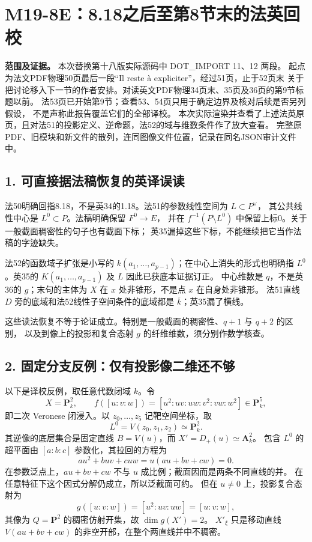 \begingroup
\section*{M19-8E：8.18之后至第8节末的法英回校}

\noindent\textbf{范围及证据。}
本次替换第十八版实际源码中 DOT\_IMPORT 11、12 两段。
起点为法文PDF物理50页最后一段“Il reste à expliciter”，经过51页，止于52页末
关于把讨论移入下一节的作者安排。对读英文PDF物理34页末、35页及36页的第9节标题以前。
法53页已开始第9节；查看53、54页只用于确定边界及核对后续是否另列假设，
不是声称此报告覆盖它们的全部译校。
本次实际渲染并查看了上述法英原页，且对法51的投影定义、逆命题，法52的域与维数条件作了放大查看。
完整原PDF、旧模块和新文件的散列，连同图像文件位置，记录在同名JSON审计文件中。

\subsection*{1. 可直接据法稿恢复的英译误读}

法50明确回指8.18，不是英34的1.18。法51的参数线性空间为 $L\subset P^\vee$，
其公共线性中心是 $L^0\subset P$。法稿明确保留 $F^0\to E$，
并在 $f^{-1}(P\setminus L^0)$ 中保留上标0。关于一般截面稠密性的句子也有截面下标；
英35漏掉这些下标，不能继续把它当作法稿的字迹缺失。

法52的函数域子扩张是小写的 $k(a_1,\ldots,a_{p-1})$；在中心上消失的形式也明确指
$L^0$。英35的 $K(a_1,\ldots,a_{p-1})$ 及 $L$ 因此已获底本证据订正。
中心维数是 $q$，不是英36的 $g$；末句的主体为 $X$ 在 $x$ 处非锥形，不是点 $x$ 在自身处非锥形。
法51直线 $D$ 旁的底域和法52线性子空间条件的底域都是 $\overline k$；英35漏了横线。

这些读法恢复不等于论证成立。特别是一般截面的稠密性、$q+1$ 与 $q+2$ 的区别，
以及到像上的投影和复合态射 $g$ 的纤维维数，须分别作数学核查。

\subsection*{2. 固定分支反例：仅有投影像二维还不够}

以下是译校反例，取任意代数闭域 $k$。令
\[
 X=\mathbf P^2_k,\qquad
 f([u:v:w])=[u^2:uv:uw:v^2:vw:w^2]\in\mathbf P^5_k,
\]
即二次 Veronese 闭浸入。以 $z_0,\ldots,z_5$ 记靶空间坐标，取
\[
 L^0=V(z_0,z_1,z_2)\simeq\mathbf P^2_k.
\]
其逆像的底层集合是固定直线 $B=V(u)$，而 $X'=D_+(u)\simeq\mathbf A^2_k$。
包含 $L^0$ 的超平面由 $[a:b:c]$ 参数化，其拉回的方程为
\[
 a u^2+buv+cuw=u(au+bv+cw)=0.
\]
在参数泛点上，$au+bv+cw$ 不与 $u$ 成比例；截面因而是两条不同直线的并。
在任意特征下这个因式分解仍成立，所以泛截面可约。
但在 $u\ne0$ 上，投影复合态射为
\[
 g([u:v:w])=[u^2:uv:uw]=[u:v:w],
\]
其像为 $Q=\mathbf P^2$ 的稠密仿射开集，故 $\dim g(X')=2$。
$X'_\xi$ 只是移动直线 $V(au+bv+cw)$ 的非空开部，在整个两直线并中不稠密。

